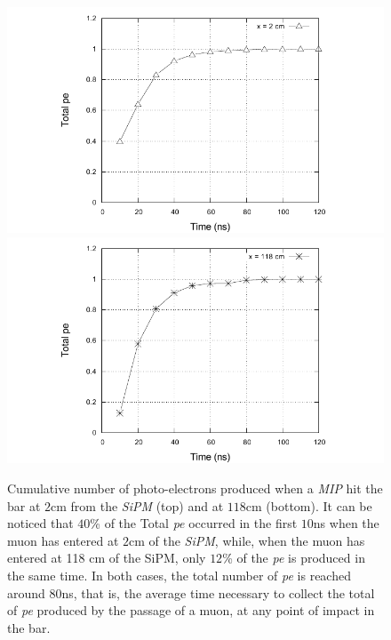 \documentclass[submitting]{nst}
\begin{document}
\begin{figure}
    \centering
    \includegraphics[scale=0.8]{Figures/cumulativo_1.pdf}
    \includegraphics[scale=0.8]{Figures/cumulativo_2.pdf}
    \caption{Cumulative number of photo-electrons produced when a \textsl{MIP} hit the bar at $2$cm from the  \textsl{SiPM} (top) and at $118$cm (bottom). It can be noticed that $40$\% of the Total \textsl{pe} occurred in the first $10$ns when the muon has entered at $2$cm of the \textsl{SiPM}, while, when the muon has entered at 118 cm of the SiPM, only $12$\% of the \textsl{pe} is produced in the same time. In both cases, the total number of \textsl{pe} is reached around $80$ns, that is, the average time necessary to collect the total of \textsl{pe} produced by the passage of a muon, at any point of impact in the bar.}
    \label{cumulative}
\end{figure}

\end{document}
